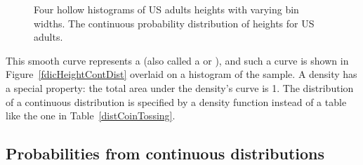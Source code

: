 \begin{figure}[h!]
	\centering
	\caption{ Four hollow histograms of US adults heights with varying bin widths.  The continuous probability distribution of heights for US adults.}
\end{figure}

This smooth curve represents a  (also called a  or ), and such a curve is shown in Figure~\ref{fdicHeightContDist} overlaid on a histogram of the sample. A density has a special property: the total area under the density's curve is 1. The distribution of a continuous distribution is specified by a density function instead of a table like the one in Table~\ref{distCoinTossing}.


\newpage

\subsection{Probabilities from continuous distributions}

